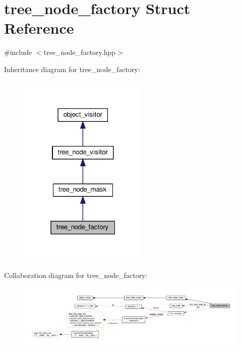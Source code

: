 \hypertarget{structtree__node__factory}{}\section{tree\+\_\+node\+\_\+factory Struct Reference}
\label{structtree__node__factory}


{\ttfamily \#include $<$tree\+\_\+node\+\_\+factory.\+hpp$>$}



Inheritance diagram for tree\+\_\+node\+\_\+factory\+:
\nopagebreak
\begin{figure}[H]
\begin{center}
\leavevmode
\includegraphics[width=175pt]{d7/da8/structtree__node__factory__inherit__graph}
\end{center}
\end{figure}


Collaboration diagram for tree\+\_\+node\+\_\+factory\+:
\nopagebreak
\begin{figure}[H]
\begin{center}
\leavevmode
\includegraphics[width=350pt]{d0/d8b/structtree__node__factory__coll__graph}
\end{center}
\end{figure}

